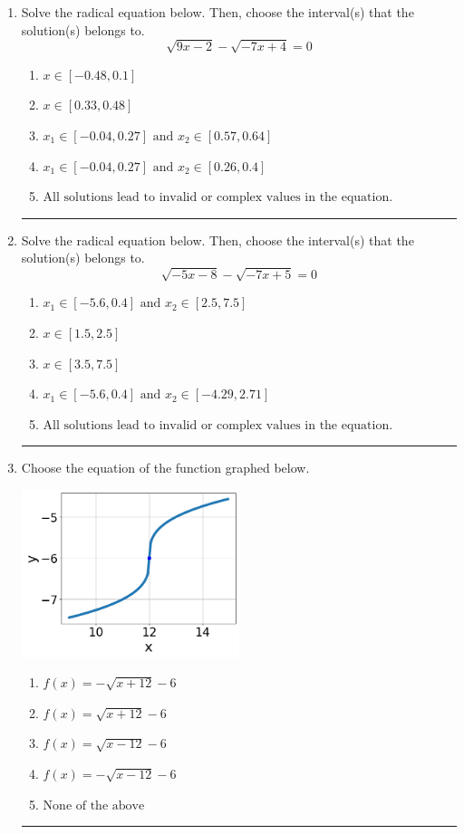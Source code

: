 \documentclass[14pt]{extbook}
\newcommand{\litem}[1]{\item#1\hspace*{-1cm}\rule{\textwidth}{0.4pt}}
\begin{document}
\begin{enumerate}
{\begin{enumerate}[label=\Alph*.]
\end{enumerate} }
\litem{
Solve the radical equation below. Then, choose the interval(s) that the solution(s) belongs to.\[ \sqrt{9 x - 2} - \sqrt{-7 x + 4} = 0 \]\begin{enumerate}[label=\Alph*.]
\item \( x \in [-0.48,0.1] \)
\item \( x \in [0.33,0.48] \)
\item \( x_1 \in [-0.04, 0.27] \text{ and } x_2 \in [0.57,0.64] \)
\item \( x_1 \in [-0.04, 0.27] \text{ and } x_2 \in [0.26,0.4] \)
\item \( \text{All solutions lead to invalid or complex values in the equation.} \)

\end{enumerate} }
\litem{
Solve the radical equation below. Then, choose the interval(s) that the solution(s) belongs to.\[ \sqrt{-5 x - 8} - \sqrt{-7 x + 5} = 0 \]\begin{enumerate}[label=\Alph*.]
\item \( x_1 \in [-5.6, 0.4] \text{ and } x_2 \in [2.5,7.5] \)
\item \( x \in [1.5,2.5] \)
\item \( x \in [3.5,7.5] \)
\item \( x_1 \in [-5.6, 0.4] \text{ and } x_2 \in [-4.29,2.71] \)
\item \( \text{All solutions lead to invalid or complex values in the equation.} \)

\end{enumerate} }
\litem{
Choose the equation of the function graphed below.
\begin{center}
    \includegraphics[width=0.5\textwidth]{../Figures/radicalGraphToEquationCopyC.png}
\end{center}
\begin{enumerate}[label=\Alph*.]
\item \( f(x) = - \sqrt{x + 12} - 6 \)
\item \( f(x) = \sqrt{x + 12} - 6 \)
\item \( f(x) = \sqrt{x - 12} - 6 \)
\item \( f(x) = - \sqrt{x - 12} - 6 \)
\item \( \text{None of the above} \)

\end{enumerate} }
\end{enumerate}
\end{document}
